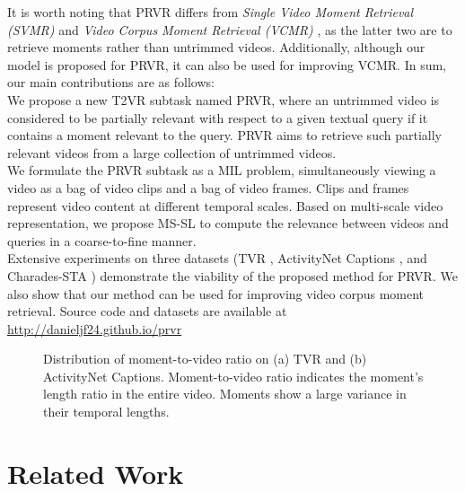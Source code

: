 \documentclass[sigconf]{acmart}
\begin{document}
It is worth noting that PRVR differs from \emph{Single Video Moment Retrieval (SVMR)} \cite{yuan2019find,zhang2020learning,xiao2021boundary,yang2021deconfounded} and \emph{Video Corpus Moment Retrieval (VCMR)} \cite{lei2020tvr,zhang2020hierarchical,zhang2021video,hou2021conquer}, as the latter two are to retrieve moments rather than untrimmed videos.
Additionally, although our model is proposed for PRVR, it can also be used for improving VCMR.
In sum, our main contributions are as follows: \\
     We propose a new T2VR subtask named PRVR, where an untrimmed video is considered to be partially relevant with respect to a given textual query if it contains a moment relevant to the query. PRVR aims to retrieve such partially relevant videos from a large collection of untrimmed videos. \\
     We formulate the PRVR subtask as a MIL problem, simultaneously viewing a video as a bag of video clips and a bag of video frames. Clips and frames represent video content at different temporal scales. Based on multi-scale video representation, we propose MS-SL to compute the  relevance between videos and queries in a coarse-to-fine manner. \\
     Extensive experiments on three datasets (TVR \cite{lei2020tvr}, ActivityNet Captions \cite{krishna2017dense}, and Charades-STA \cite{gao2017tall}) demonstrate the viability of the proposed method for PRVR. We also show that our method can be used for improving video corpus moment retrieval. Source code and datasets are available at \url{http://danieljf24.github.io/prvr}



\begin{figure}[tb!]
\vspace{-4mm}
\caption{Distribution of moment-to-video ratio on (a) TVR and (b) ActivityNet Captions. Moment-to-video ratio indicates the moment's length ratio in the entire video. Moments show a large variance in their temporal lengths. }\label{fig:ratio_distribution}
\end{figure}


\section{Related Work} \label{sec:rel-work}
\end{document}
